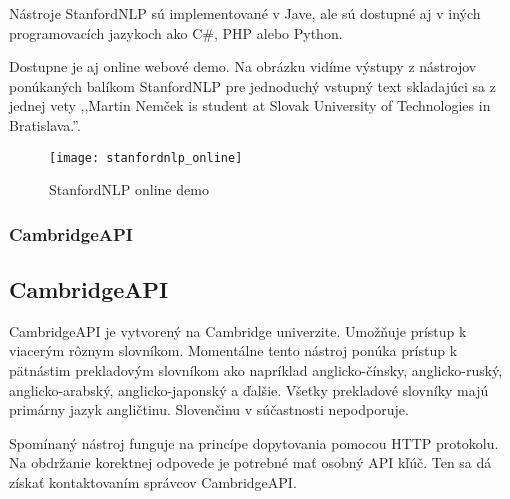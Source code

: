 Nástroje StanfordNLP sú implementované v Jave, ale sú dostupné aj v iných programovacích jazykoch ako C\#, PHP alebo Python.

Dostupne je aj online webové demo. Na obrázku  vidíme výstupy z nástrojov ponúkaných balíkom StanfordNLP pre jednoduchý vstupný text skladajúci sa z jednej vety ,,Martin Nemček is student at Slovak University of Technologies in Bratislava.''.

\begin{figure}[H]
\begin{center}\texttt{[image: stanfordnlp\_online]}\end{center}
\caption[StanfordNLP online demo]{StanfordNLP online demo}\label{fig:stanfordnlp_online_demo}
\end{figure}

%
%
{
	\subsubsection{CambridgeAPI}
}
{
	\subsection{CambridgeAPI}
}
\label{subsubsec:cambridgeapi}
CambridgeAPI je vytvorený na Cambridge univerzite. Umožňuje prístup k viacerým rôznym slovníkom. Momentálne tento nástroj ponúka prístup k pätnástim prekladovým slovníkom ako napríklad anglicko-čínsky, anglicko-ruský, anglicko-arabský, anglicko-japonský a ďalšie. Všetky prekladové slovníky majú primárny jazyk angličtinu. Slovenčinu v súčastnosti nepodporuje.

Spomínaný nástroj funguje na princípe dopytovania pomocou HTTP protokolu. Na obdržanie korektnej odpovede je potrebné mať osobný API kľúč. Ten sa dá získať kontaktovaním správcov CambridgeAPI.

